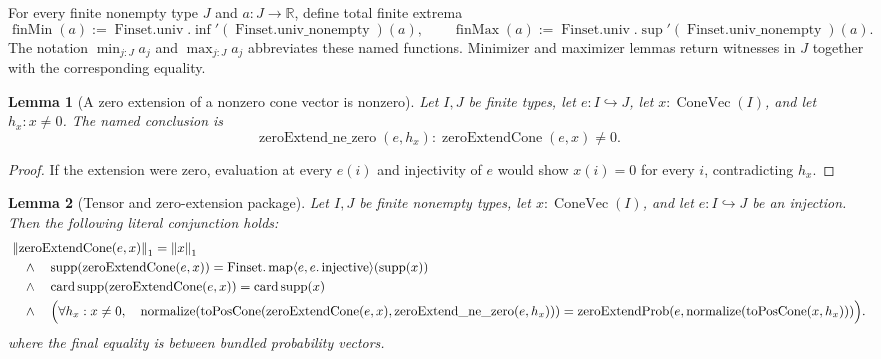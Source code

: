 \documentclass[9pt]{extarticle}
\newtheorem{lemma}{Lemma}[section]
\theoremstyle{definition}
\theoremstyle{remark}
\newcommand{\R}{\mathbb R}
\newcommand{\supp}{\operatorname{supp}}
\newcommand{\norm}[1]{\left\lVert #1\right\rVert}
\newcommand{\card}{\operatorname{card}}
\begin{document}
For every finite nonempty type $J$ and $a:J\to\R$, define total finite
extrema
\[
 \operatorname{finMin}(a):=
 \operatorname{Finset.univ}.\operatorname{inf}'
   (\operatorname{Finset.univ\_nonempty})(a),
 \qquad
 \operatorname{finMax}(a):=
 \operatorname{Finset.univ}.\operatorname{sup}'
   (\operatorname{Finset.univ\_nonempty})(a).
\]
The notation $\min_{j:J}a_j$ and $\max_{j:J}a_j$ abbreviates these named
functions.  Minimizer and maximizer lemmas return witnesses in $J$ together
with the corresponding equality.

\begin{lemma}[A zero extension of a nonzero cone vector is nonzero]
\label{lem:fnd-zero-extend-nonzero}
Let $I,J$ be finite types, let $e:I\hookrightarrow J$, let
$x:\operatorname{ConeVec}(I)$, and let $h_x:x\neq0$.  The named conclusion
is
\[
 \operatorname{zeroExtend\_ne\_zero}(e,h_x):
 \operatorname{zeroExtendCone}(e,x)\neq0.
\]
\end{lemma}

\begin{proof}
If the extension were zero, evaluation at every $e(i)$ and injectivity of
$e$ would show $x(i)=0$ for every $i$, contradicting $h_x$.
\end{proof}

\begin{lemma}[Tensor and zero-extension package]
\label{lem:fnd-tensor-extension-package}
Let $I,J$ be finite nonempty types, let $x:\operatorname{ConeVec}(I)$, and
let $e:I\hookrightarrow J$ be an injection.  Then the following literal
conjunction holds:
\begin{align*}
 &\norm{\operatorname{zeroExtendCone}(e,x)}_1=\norm{x}_1\\
 &\quad\wedge\quad
 \supp(\operatorname{zeroExtendCone}(e,x))
 =\operatorname{Finset.map}\langle e,e.\operatorname{injective}\rangle
    (\supp(x))\\
 &\quad\wedge\quad
 \card\supp(\operatorname{zeroExtendCone}(e,x))=\card\supp(x)\\
 &\quad\wedge\quad
 \Bigl(\forall h_x:x\neq0,\quad
 \operatorname{normalize}\!\left(
   \operatorname{toPosCone}
    (\operatorname{zeroExtendCone}(e,x),
     \operatorname{zeroExtend\_ne\_zero}(e,h_x))\right)
 =\operatorname{zeroExtendProb}\!\left(e,
   \operatorname{normalize}(\operatorname{toPosCone}(x,h_x))\right)
 \Bigr).
\end{align*}
where the final equality is between bundled probability vectors.
\end{lemma}
\end{document}
